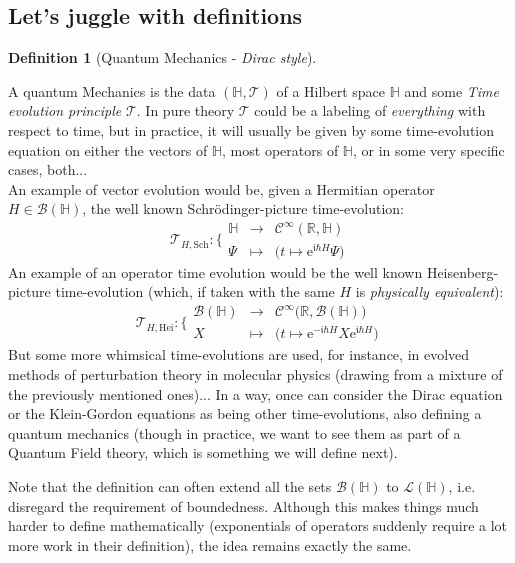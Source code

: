 \documentclass[a4paper,11pt]{article}
\numberwithin{equation}{section}
\theoremstyle{definition}
\newtheorem{definition}{Definition}
\newcommand{\e}{{\mathrm{e}}}
\begin{document}
\subsection{Let's juggle with definitions}
\begin{definition}[Quantum Mechanics - \emph{Dirac style}]$\quad$

A quantum Mechanics is the data $(\mathbb{H},\mathcal{T})$ of a Hilbert space $\mathbb{H}$ and some \emph{Time evolution principle} $\mathcal{T}$. In pure theory $\mathcal{T}$ could be a labeling of \emph{everything} with respect to time, but in practice, it will usually be given by some time-evolution equation on either the vectors of $\mathbb{H}$, most operators of $\mathbb{H}$, or in some very specific cases, both...\\
An example of vector evolution would be, given a Hermitian operator $H\in\mathcal{B}(\mathbb{H})$, the well known Schrödinger-picture time-evolution:
$$\boxed{\mathcal{T}_{H,\mathrm{Sch}}: \Bigg\{
\begin{matrix}
\mathbb{H} & \to & \mathcal{C}^\infty(\mathbb{R},\mathbb{H})\\
\Psi & \mapsto & \Big(t\mapsto \e^{\mathfrak{i}\hbar H}\Psi\Big)
\end{matrix}}$$
An example of an operator time evolution would be the well known Heisenberg-picture time-evolution (which, if taken with the same $H$ is \emph{physically equivalent}):
$$\boxed{\mathcal{T}_{H,\mathrm{Hei}}: \Bigg\{
\begin{matrix}
\mathcal{B}(\mathbb{H}) & \to & \mathcal{C}^\infty\big(\mathbb{R},\mathcal{B}(\mathbb{H})\big)\\
X & \mapsto & \Big(t\mapsto \e^{-\mathfrak{i}\hbar H}X\e^{\mathfrak{i}\hbar H}\Big)
\end{matrix}}$$
But some more whimsical time-evolutions are used, for instance, in evolved methods of perturbation theory in molecular physics (drawing from a mixture of the previously mentioned ones)... In a way, once can consider the Dirac equation or the Klein-Gordon equations as being other time-evolutions, also defining a quantum mechanics (though in practice, we want to see them as part of a Quantum Field theory, which is something we will define next).

Note that the definition can often extend all the sets $\mathcal{B}(\mathbb{H})$ to $\mathcal{L}(\mathbb{H})$, i.e. disregard the requirement of boundedness. Although this makes things much harder to define mathematically (exponentials of operators suddenly require a lot more work in their definition), the idea remains exactly the same.
\end{definition}
\end{document}

